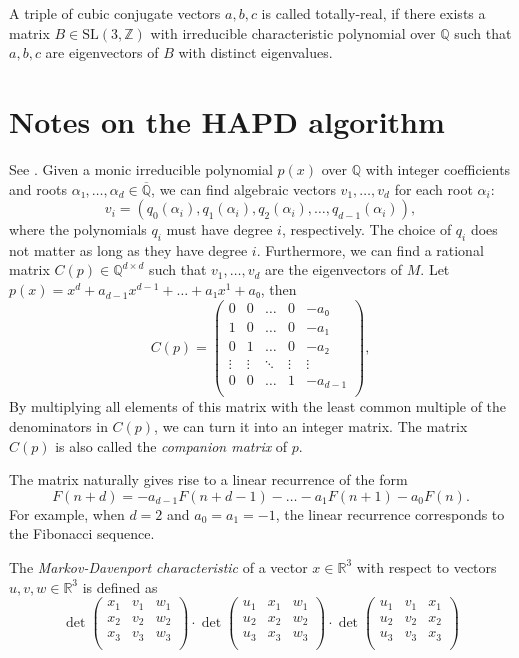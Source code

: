 A triple of cubic conjugate vectors $a, b, c$ is called totally-real, if there
exists a matrix $B ∈ \text{SL}(3, ℤ)$ with irreducible characteristic
polynomial over $ℚ$ such that $a, b, c$ are eigenvectors of $B$ with distinct
eigenvalues.

\section{Notes on the HAPD algorithm}

See \cite{Karpenkov2024}.
Given a monic irreducible polynomial $p(x)$ over $ℚ$ with integer coefficients and roots $α₁, \dots, α_d ∈ \overline{ℚ}$,
we can find algebraic vectors $v_1, \dots, v_d$ for each root $α_i$:
\[
  v_i = (q_0(α_i), q_1(α_i), q_2(α_i), \dots, q_{d-1}(α_i)),
\]
where the polynomials $q_i$ must have degree $i$, respectively.
The choice of $q_i$ does not matter as long as they have degree $i$.
Furthermore, we can find a rational matrix $C(p) ∈ ℚ^{d × d}$ such that $v_1, \dots, v_d$ are the eigenvectors of $M$.
Let $p(x) = x^d + a_{d-1} x^{d-1} + \dots + a₁ x^1 + a₀$, then
\[
  C(p) =
  \begin{pmatrix}
    0 & 0 & \dots & 0 & -a₀ \\
    1 & 0 & \dots & 0 & -a₁ \\
    0 & 1 & \dots & 0 & -a₂ \\
    \vdots & \vdots & \ddots & \vdots & \vdots \\
    0 & 0 & \dots & 1 & -a_{d-1} \\
  \end{pmatrix},
\]
By multiplying all elements of this matrix with the least common multiple of the denominators in $C(p)$,
we can turn it into an integer matrix.
The matrix $C(p)$ is also called the \emph{companion matrix} of $p$.

The matrix naturally gives rise to a linear recurrence of the form
\[
  F(n + d) = -a_{d-1} F(n + d - 1) - \dots - a_1 F(n + 1) - a_0 F(n).
\]
For example, when $d = 2$ and $a_0 = a_1 = -1$, the linear recurrence
corresponds to the Fibonacci sequence.

\begin{definition}
  The \emph{Markov-Davenport characteristic} of a vector $x ∈ ℝ^3$ with respect to vectors $u, v, w ∈ ℝ^3$
  is defined as
  \[
    \det
    \begin{pmatrix}
      x_1 & v_1 & w_1 \\
      x_2 & v_2 & w_2 \\
      x_3 & v_3 & w_3 \\
    \end{pmatrix}
    · \det
    \begin{pmatrix}
      u_1 & x_1 & w_1 \\
      u_2 & x_2 & w_2 \\
      u_3 & x_3 & w_3 \\
    \end{pmatrix}
    · \det
    \begin{pmatrix}
      u_1 & v_1 & x_1 \\
      u_2 & v_2 & x_2 \\
      u_3 & v_3 & x_3 \\
    \end{pmatrix}
  \]
\end{definition}

